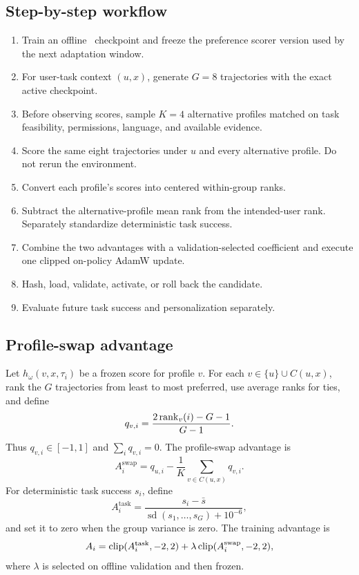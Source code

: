 \subsection{Step-by-step workflow}

\begin{enumerate}
  \item Train an offline \prlhf\ checkpoint and freeze the preference scorer
  version used by the next adaptation window.
  \item For user-task context $(u,x)$, generate $G=8$ trajectories with the
  exact active checkpoint.
  \item Before observing scores, sample $K=4$ alternative profiles matched on
  task feasibility, permissions, language, and available evidence.
  \item Score the same eight trajectories under $u$ and every alternative
  profile.  Do not rerun the environment.
  \item Convert each profile's scores into centered within-group ranks.
  \item Subtract the alternative-profile mean rank from the intended-user
  rank.  Separately standardize deterministic task success.
  \item Combine the two advantages with a validation-selected coefficient and
  execute one clipped on-policy AdamW update.
  \item Hash, load, validate, activate, or roll back the candidate.
  \item Evaluate future task success and personalization separately.
\end{enumerate}

\subsection{Profile-swap advantage}

Let $h_\omega(v,x,\tau_i)$ be a frozen score for profile $v$.  For each
$v\in\{u\}\cup C(u,x)$, rank the $G$ trajectories from least to most
preferred, use average ranks for ties, and define
\begin{equation}
  q_{v,i}
  =
  \frac{2\operatorname{rank}_v(i)-G-1}{G-1}.
  \label{eq:profile-rank}
\end{equation}
Thus $q_{v,i}\in[-1,1]$ and $\sum_iq_{v,i}=0$.  The profile-swap advantage is
\begin{equation}
  A^{\mathrm{swap}}_i
  =
  q_{u,i}
  -
  \frac{1}{K}\sum_{v\in C(u,x)}q_{v,i}.
  \label{eq:swap-advantage}
\end{equation}
For deterministic task success $s_i$, define
\begin{equation}
  A^{\mathrm{task}}_i
  =
  \frac{s_i-\bar s}{\operatorname{sd}(s_1,\ldots,s_G)+10^{-6}},
\end{equation}
and set it to zero when the group variance is zero.  The training advantage is
\begin{equation}
  A_i
  =
  \operatorname{clip}(A^{\mathrm{task}}_i,-2,2)
  +
  \lambda\operatorname{clip}(A^{\mathrm{swap}}_i,-2,2),
  \label{eq:profile-total-adv}
\end{equation}
where $\lambda$ is selected on offline validation and then frozen.

